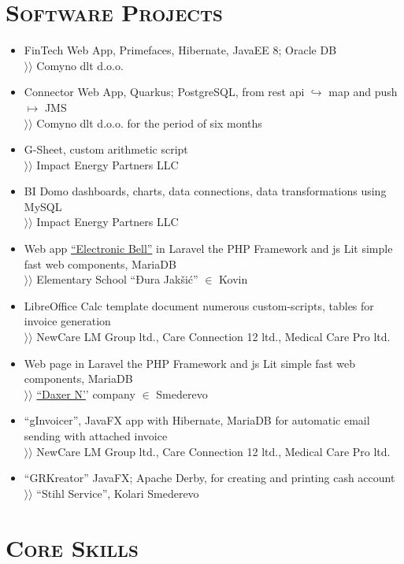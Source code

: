 \documentclass{article}
\begin{document}
\section{\textsc{Software Projects}}

\begin{itemize}[parsep=1.5pt]
\item  FinTech Web App, Primefaces, Hibernate, JavaEE 8; Oracle DB\\
$\rangle\!\rangle$ Comyno dlt d.o.o.
\item Connector Web App, Quarkus; PostgreSQL, from rest api $\hookrightarrow$ map and push $\mapsto$ JMS\\
$\rangle\!\rangle$ Comyno dlt d.o.o. for the period of six months
\item G-Sheet, custom arithmetic script\\
$\rangle\!\rangle$ Impact Energy Partners LLC
\item BI Domo dashboards, charts, data connections, data transformations using MySQL\\
$\rangle\!\rangle$ Impact Energy Partners LLC
\item Web app \href{https://zvono.nastavnikinformatike.com}{``Electronic Bell''} in Laravel the PHP Framework and js Lit simple fast web components, MariaDB\\
$\rangle\!\rangle$ Elementary School ``Đura Jakšić'' $\in$ Kovin
\item LibreOffice Calc template document numerous custom-scripts, tables for invoice generation\\ 
$\rangle\!\rangle$ NewCare LM Group ltd., Care Connection 12 ltd., Medical Care Pro ltd.
\item Web page in Laravel the PHP Framework and js Lit simple fast web components, MariaDB\\
$\rangle\!\rangle$ \href{https://www.daxern.rs}{``Daxer N'}' company $\in$ Smederevo
\item ``gInvoicer'', JavaFX app with Hibernate, MariaDB for automatic email sending with attached invoice\\
$\rangle\!\rangle$ NewCare LM Group ltd., Care Connection 12 ltd., Medical Care Pro ltd.
\item ``GRKreator'' JavaFX; Apache Derby, for creating and printing cash account\\
$\rangle\!\rangle$ ``Stihl Service'', Kolari Smederevo
\end{itemize}

\section{\textsc{Core Skills}}
\end{document}
